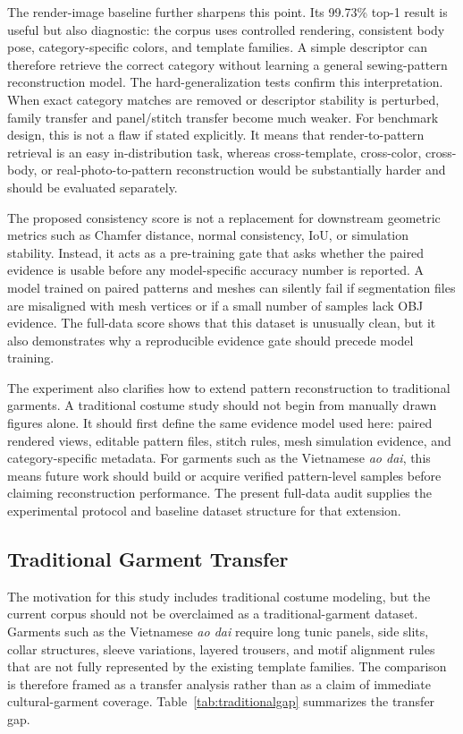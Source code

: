 \documentclass[pdflatex,sn-mathphys-num]{sn-jnl}
\begin{document}
The render-image baseline further sharpens this point. Its 99.73\% top-1 result is useful but also diagnostic: the corpus uses controlled rendering, consistent body pose, category-specific colors, and template families. A simple descriptor can therefore retrieve the correct category without learning a general sewing-pattern reconstruction model. The hard-generalization tests confirm this interpretation. When exact category matches are removed or descriptor stability is perturbed, family transfer and panel/stitch transfer become much weaker. For benchmark design, this is not a flaw if stated explicitly. It means that render-to-pattern retrieval is an easy in-distribution task, whereas cross-template, cross-color, cross-body, or real-photo-to-pattern reconstruction would be substantially harder and should be evaluated separately.

The proposed consistency score is not a replacement for downstream geometric metrics such as Chamfer distance, normal consistency, IoU, or simulation stability. Instead, it acts as a pre-training gate that asks whether the paired evidence is usable before any model-specific accuracy number is reported. A model trained on paired patterns and meshes can silently fail if segmentation files are misaligned with mesh vertices or if a small number of samples lack OBJ evidence. The full-data score shows that this dataset is unusually clean, but it also demonstrates why a reproducible evidence gate should precede model training.

The experiment also clarifies how to extend pattern reconstruction to traditional garments. A traditional costume study should not begin from manually drawn figures alone. It should first define the same evidence model used here: paired rendered views, editable pattern files, stitch rules, mesh simulation evidence, and category-specific metadata. For garments such as the Vietnamese \textit{ao dai}, this means future work should build or acquire verified pattern-level samples before claiming reconstruction performance. The present full-data audit supplies the experimental protocol and baseline dataset structure for that extension.

\subsection{Traditional Garment Transfer}

The motivation for this study includes traditional costume modeling, but the current corpus should not be overclaimed as a traditional-garment dataset. Garments such as the Vietnamese \textit{ao dai} require long tunic panels, side slits, collar structures, sleeve variations, layered trousers, and motif alignment rules that are not fully represented by the existing template families. The comparison is therefore framed as a transfer analysis rather than as a claim of immediate cultural-garment coverage. Table~\ref{tab:traditionalgap} summarizes the transfer gap.
\end{document}
